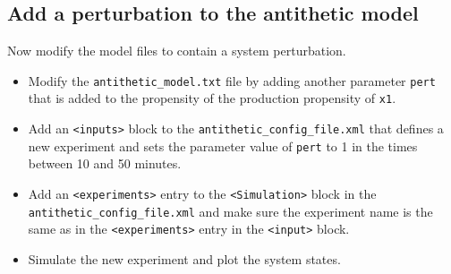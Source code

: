 \documentclass[11pt]{article} %
\begin{document}
\subsection{Add a perturbation to the antithetic model}
Now modify the model files to contain a system perturbation. 
\begin{itemize}
\item Modify the \texttt{antithetic\_model.txt} file by adding another parameter \texttt{pert} that is added to the propensity of the production propensity of \texttt{x1}. 
\item Add an \texttt{<inputs>} block to the \texttt{antithetic\_config\_file.xml} that defines a new experiment and sets the parameter value of \texttt{pert} to 1 in the times between 10 and 50 minutes.
\item Add an \texttt{<experiments>} entry to the \texttt{<Simulation>} block in the \texttt{antithetic\_config\_file.xml} and make sure the experiment name is the same as in the \texttt{<experiments>} entry in the \texttt{<input>} block. 
\item Simulate the new experiment and plot the system states. 
\end{itemize}
  
\end{document}
